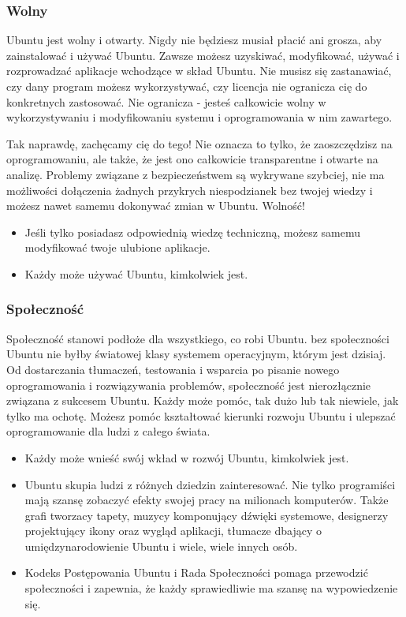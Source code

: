 \subsubsection{Wolny}
Ubuntu jest wolny i otwarty. Nigdy nie będziesz musiał płacić ani grosza, aby zainstalować i używać Ubuntu. Zawsze możesz uzyskiwać, modyfikować, używać i rozprowadzać aplikacje wchodzące w skład Ubuntu. Nie musisz się zastanawiać, czy dany program możesz wykorzystywać, czy licencja nie ogranicza cię do konkretnych zastosować. Nie ogranicza - jesteś całkowicie wolny w wykorzystywaniu i modyfikowaniu systemu i oprogramowania w nim zawartego.

Tak naprawdę, zachęcamy cię do tego! Nie oznacza to tylko, że zaoszczędzisz na oprogramowaniu, ale także, że jest ono całkowicie transparentne i otwarte na analizę. Problemy związane z bezpieczeństwem są wykrywane szybciej, nie ma możliwości dołączenia żadnych przykrych niespodzianek bez twojej wiedzy i możesz nawet samemu dokonywać zmian w Ubuntu. Wolność!
\begin{itemize}
\item Jeśli tylko posiadasz odpowiednią wiedzę techniczną, możesz samemu modyfikować twoje ulubione aplikacje.
\item Każdy może używać Ubuntu, kimkolwiek jest.
\end{itemize}


\subsubsection{Społeczność}
Społeczność stanowi podłoże dla wszystkiego, co robi Ubuntu. bez społeczności Ubuntu nie byłby światowej klasy systemem operacyjnym, którym jest dzisiaj. Od dostarczania tłumaczeń, testowania i wsparcia po pisanie nowego oprogramowania i rozwiązywania problemów, społeczność jest nierozłącznie związana z sukcesem Ubuntu. Każdy może pomóc, tak dużo lub tak niewiele, jak tylko ma ochotę. Możesz pomóc kształtować kierunki rozwoju Ubuntu i ulepszać oprogramowanie dla ludzi z całego świata.
\begin{itemize}
\item Każdy może wnieść swój wkład w rozwój Ubuntu, kimkolwiek jest.
\item Ubuntu skupia ludzi z różnych dziedzin zainteresować. Nie tylko programiści mają szansę zobaczyć efekty swojej pracy na milionach komputerów. Także grafi tworzacy tapety, muzycy komponujący dźwięki systemowe, designerzy projektujący ikony oraz wygląd aplikacji, tłumacze dbający o umiędzynarodowienie Ubuntu i wiele, wiele innych osób.
\item Kodeks Postępowania Ubuntu i Rada Społeczności pomaga przewodzić społeczności i zapewnia, że każdy sprawiedliwie ma szansę na wypowiedzenie się.
\end{itemize}




